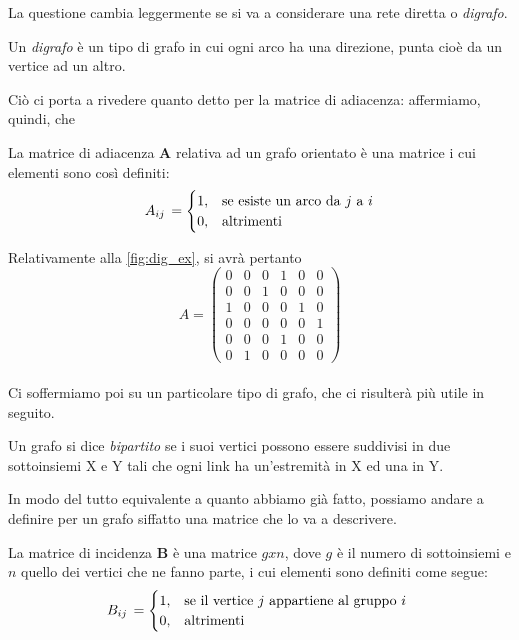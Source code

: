 La questione cambia leggermente se si va a considerare una rete diretta o \emph{digrafo}.
\begin{definizione}
Un \emph{digrafo} è un tipo di grafo in cui ogni arco ha una direzione, punta cioè da un vertice ad un altro.
\end{definizione}
Ciò ci porta a rivedere quanto detto per la matrice di adiacenza: affermiamo, quindi, che
\begin{definizione}
La matrice di adiacenza \textbf{A} relativa ad un grafo orientato è una matrice i cui elementi sono così definiti:
\[
A_{ij} \, =
\begin{cases}
1, & \text{se esiste un arco da $ j $ a $ i $}\\ 
0, & \text{altrimenti}
\end{cases}
\]
\end{definizione}

Relativamente alla \cref{fig:dig_ex}, si avrà pertanto \\
\begin{equation}
A =
\begin{pmatrix}
0 & 0 & 0 & 1 & 0 & 0 \\
0 & 0 & 1 & 0 & 0 & 0 \\
1 & 0 & 0 & 0 & 1 & 0 \\
0 & 0 & 0 & 0 & 0 & 1 \\
0 & 0 & 0 & 1 & 0 & 0 \\
0 & 1 & 0 & 0 & 0 & 0
\end{pmatrix}
\end{equation}
\\
Ci soffermiamo poi su un particolare tipo di grafo, che ci risulterà più utile in seguito.
\begin{definizione} \cite{Bondy}
Un grafo si dice \emph{bipartito} se i suoi vertici possono essere suddivisi in due sottoinsiemi X e Y tali che ogni link ha un'estremità in X ed una in Y. 
\end{definizione}
In modo del tutto equivalente a quanto abbiamo già fatto, possiamo andare a definire per un grafo siffatto una matrice che lo va a descrivere.
\begin{definizione}
La matrice di incidenza \textbf{B} è una matrice $ g x n $, dove $ g $ è il numero di sottoinsiemi e $ n $ quello dei vertici che ne fanno parte, i cui elementi sono definiti come segue:
\[
B_{ij} \, =
\begin{cases}
1, & \text{se il vertice $ j $ appartiene al gruppo $ i $ }\\
0, & \text{altrimenti}
\end{cases}
\]
\end{definizione}

